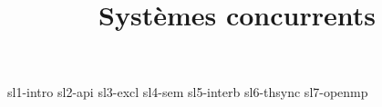 \documentclass {beamer}
\title {Systèmes concurrents}
\begin{document}

 {sl1-intro}
 {sl2-api}
 {sl3-excl}
 {sl4-sem}
 {sl5-interb}
 {sl6-thsync}
 {sl7-openmp}
\end{document}
